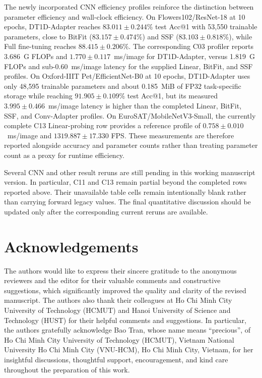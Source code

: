 \documentclass[pdflatex,sn-mathphys-num]{sn-jnl}
\theoremstyle{thmstyleone}
\theoremstyle{thmstyletwo}
\theoremstyle{thmstylethree}
\begin{document}
The newly incorporated CNN efficiency profiles reinforce the distinction between parameter efficiency and wall-clock efficiency. On Flowers102/ResNet-18 at 10 epochs, DT1D-Adapter reaches $83.011\pm0.244\%$ test Acc@1 with 53,550 trainable parameters, close to BitFit ($83.157\pm0.474\%$) and SSF ($83.103\pm0.818\%$), while Full fine-tuning reaches $88.415\pm0.206\%$. The corresponding C03 profiler reports 3.686~G FLOPs and $1.770\pm0.117$~ms/image for DT1D-Adapter, versus 1.819~G FLOPs and sub-$0.60$~ms/image latency for the supplied Linear, BitFit, and SSF profiles. On Oxford-IIIT Pet/EfficientNet-B0 at 10 epochs, DT1D-Adapter uses only 48,595 trainable parameters and about 0.185~MiB of FP32 task-specific storage while reaching $91.905\pm0.109\%$ test Acc@1, but its measured $3.995\pm0.466$~ms/image latency is higher than the completed Linear, BitFit, SSF, and Conv-Adapter profiles. On EuroSAT/MobileNetV3-Small, the currently complete C13 Linear-probing row provides a reference profile of $0.758\pm0.010$~ms/image and $1319.887\pm17.330$ FPS. These measurements are therefore reported alongside accuracy and parameter counts rather than treating parameter count as a proxy for runtime efficiency.

Several CNN and other result reruns are still pending in this working manuscript version. In particular, C11 and C13 remain partial beyond the completed rows reported above. Their unavailable table cells remain intentionally blank rather than carrying forward legacy values. The final quantitative discussion should be updated only after the corresponding current reruns are available.
\section*{Acknowledgements}



The authors would like to express their sincere gratitude to the anonymous reviewers and the editor for their valuable comments and constructive suggestions, which significantly improved the quality and clarity of the revised manuscript. The authors also thank their colleagues at Ho Chi Minh City University of Technology (HCMUT) and Hanoi University of Science and Technology (HUST) for their helpful comments and suggestions. In particular, the authors gratefully acknowledge Bao Tran, whose name means ``precious'', of Ho Chi Minh City University of Technology (HCMUT), Vietnam National University Ho Chi Minh City (VNU-HCM), Ho Chi Minh City, Vietnam, for her insightful discussions, thoughtful support, encouragement, and kind care throughout the preparation of this work. 
\end{document}
